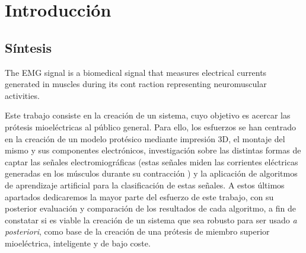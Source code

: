 
\chapter{Introducción} %
\label{Chapter1}






%
%
%
%

\section{Síntesis}
\label{sec:outline}


The  EMG  signal  is  a  biomedical  
signal   that   measures   electrical   currents   generated   in   
muscles       during       its       cont
raction       representing       
neuromuscular  activities.


Este trabajo consiste en la creación de un sistema, cuyo objetivo es acercar las
prótesis mioeléctricas al público general. Para ello, los esfuerzos se han
centrado en la creación de un modelo protésico mediante impresión 3D, el montaje del
mismo y sus componentes electrónicos, investigación sobre las distintas formas de captar
las señales electromiográficas (estas señales miden las corrientes eléctricas generadas en los músculos durante su contracción \cite{emg}) y la aplicación de algoritmos de aprendizaje artificial para la
clasificación de estas señales. A estos últimos apartados dedicaremos la mayor parte del
esfuerzo de este trabajo, con su posterior evaluación y comparación de los resultados de
cada algoritmo, a fin de constatar si es viable la creación de un sistema que sea robusto
para ser usado \textit{a posteriori}, como base de la creación de una prótesis de
miembro superior mioeléctrica, inteligente y de bajo coste.




